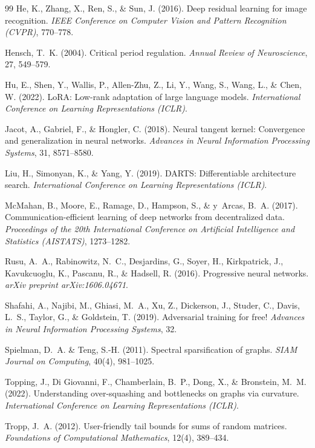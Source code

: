 ﻿\documentclass[12pt, a4paper, openany]{report}
\begin{document}
\begin{thebibliography}{99}
He, K., Zhang, X., Ren, S., \& Sun, J. (2016).
Deep residual learning for image recognition.
\textit{IEEE Conference on Computer Vision and Pattern Recognition (CVPR)},
770--778.

Hensch, T.~K. (2004).
Critical period regulation.
\textit{Annual Review of Neuroscience}, 27, 549--579.

Hu, E., Shen, Y., Wallis, P., Allen-Zhu, Z., Li, Y., Wang, S.,
Wang, L., \& Chen, W. (2022).
LoRA: Low-rank adaptation of large language models.
\textit{International Conference on Learning Representations (ICLR)}.

Jacot, A., Gabriel, F., \& Hongler, C. (2018).
Neural tangent kernel: Convergence and generalization in neural networks.
\textit{Advances in Neural Information Processing Systems}, 31, 8571--8580.

Liu, H., Simonyan, K., \& Yang, Y. (2019).
DARTS: Differentiable architecture search.
\textit{International Conference on Learning Representations (ICLR)}.

McMahan, B., Moore, E., Ramage, D., Hampson, S., \& y~Arcas, B.~A. (2017).
Communication-efficient learning of deep networks from decentralized data.
\textit{Proceedings of the 20th International Conference on Artificial
Intelligence and Statistics (AISTATS)}, 1273--1282.

Rusu, A.~A., Rabinowitz, N.~C., Desjardins, G., Soyer, H., Kirkpatrick, J.,
Kavukcuoglu, K., Pascanu, R., \& Hadsell, R. (2016).
Progressive neural networks.
\textit{arXiv preprint arXiv:1606.04671}.

Shafahi, A., Najibi, M., Ghiasi, M.~A., Xu, Z., Dickerson, J., Studer, C.,
Davis, L.~S., Taylor, G., \& Goldstein, T. (2019).
Adversarial training for free!
\textit{Advances in Neural Information Processing Systems}, 32.

Spielman, D.~A. \& Teng, S.-H. (2011).
Spectral sparsification of graphs.
\textit{SIAM Journal on Computing}, 40(4), 981--1025.

Topping, J., Di Giovanni, F., Chamberlain, B.~P., Dong, X., \&
Bronstein, M.~M. (2022).
Understanding over-squashing and bottlenecks on graphs via curvature.
\textit{International Conference on Learning Representations (ICLR)}.

Tropp, J.~A. (2012).
User-friendly tail bounds for sums of random matrices.
\textit{Foundations of Computational Mathematics}, 12(4), 389--434.


\end{thebibliography}
\end{document}
